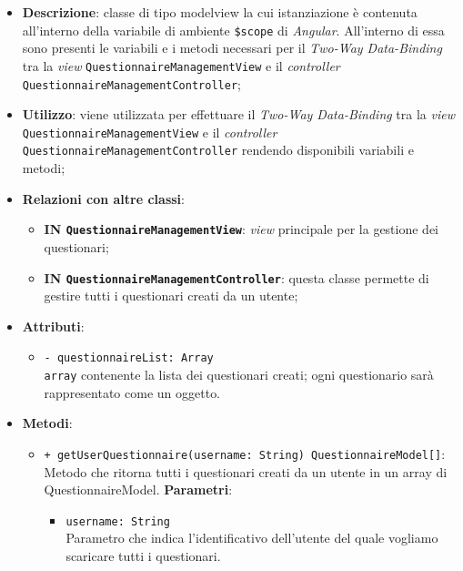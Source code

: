 	\begin{itemize}
		\item \textbf{Descrizione}: classe di tipo modelview la cui istanziazione è contenuta all'interno della variabile di ambiente \texttt{\$scope} di \textit{Angular}. All'interno di essa sono presenti le variabili e i metodi necessari per il \textit{Two-Way Data-Binding} tra la \textit{view} \texttt{QuestionnaireManagementView} e il \textit{controller} \texttt{QuestionnaireManagementController};
		\item \textbf{Utilizzo}: viene utilizzata per effettuare il \textit{Two-Way Data-Binding} tra la \textit{view} \texttt{QuestionnaireManagementView} e il \textit{controller} \texttt{QuestionnaireManagementController} rendendo disponibili variabili e metodi;
		\item \textbf{Relazioni con altre classi}: 
		\begin{itemize}
			\item \textbf{IN \texttt{QuestionnaireManagementView}}: \textit{view} principale per la gestione dei questionari; 
			\item \textbf{IN \texttt{QuestionnaireManagementController}}: questa classe permette di gestire tutti i questionari creati da un utente;
		\end{itemize}
		\item \textbf{Attributi}: 
		\begin{itemize}
			\item \texttt{- questionnaireList: Array} \\ \texttt{array} contenente la lista dei questionari creati; ogni questionario sarà rappresentato come un oggetto.
		\end{itemize}
		\item \textbf{Metodi}:
		\begin{itemize}
				\item \texttt{+ getUserQuestionnaire(username: String) QuestionnaireModel[]}: \\Metodo che ritorna tutti i questionari creati da un utente in un array di QuestionnaireModel.
				\textbf{Parametri}:
				\begin{itemize}
					\item \texttt{username: String}\\ 
					Parametro che indica l'identificativo dell'utente del quale vogliamo scaricare tutti i questionari.
				\end{itemize}
		\end{itemize} 
	\end{itemize}
	
	